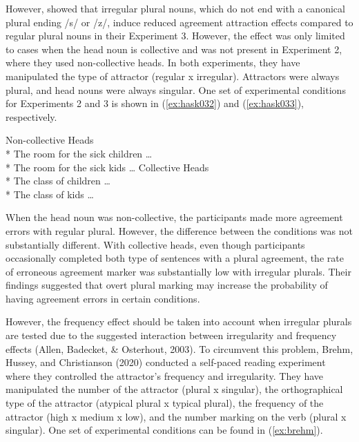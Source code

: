 However,  showed that irregular plural nouns, which do not end with a canonical plural ending /s/ or /z/, induce reduced agreement attraction effects compared to regular plural nouns in their Experiment 3. However, the effect was only limited to cases when the head noun is collective and was not present in Experiment 2, where they used non-collective heads. In both experiments, they have manipulated the type of attractor (regular x irregular). Attractors were always plural, and head nouns were always singular. One set of experimental conditions for Experiments 2 and 3 is shown in (\ref{ex:hask032}) and (\ref{ex:hask033}), respectively. 

\ea \label{ex:hask032} {Non-collective Heads}
     \\* The {room} for the sick {children} \ldots{}
     \\* The {room} for the sick {kids} \ldots{}
    \z
\ex \label{ex:hask033} {Collective Heads}
     \\* The {class} of {children} \ldots{}
     \\* The {class} of {kids} \ldots{}
    \z
\z

When the head noun was non-collective, the participants made more agreement errors with regular plural. However, the difference between the conditions was not substantially different. With collective heads, even though participants occasionally completed both type of sentences with a plural agreement, the rate of erroneous agreement marker was substantially low with irregular plurals. Their findings suggested that overt plural marking may increase the probability of having agreement errors in certain conditions.  

However, the frequency effect should be taken into account when irregular plurals are tested due to the suggested interaction between irregularity and frequency effects (Allen, Badecket, \& Osterhout, 2003). To circumvent this problem, Brehm, Hussey, and Christianson (2020) conducted a self-paced reading experiment where they controlled the attractor's frequency and irregularity. They have manipulated the number of the attractor (plural x singular), the orthographical type of the attractor (atypical plural x typical plural), the frequency of the attractor (high x medium x low), and the number marking on the verb (plural x singular). One set of experimental conditions can be found in (\ref{ex:brehm}).

